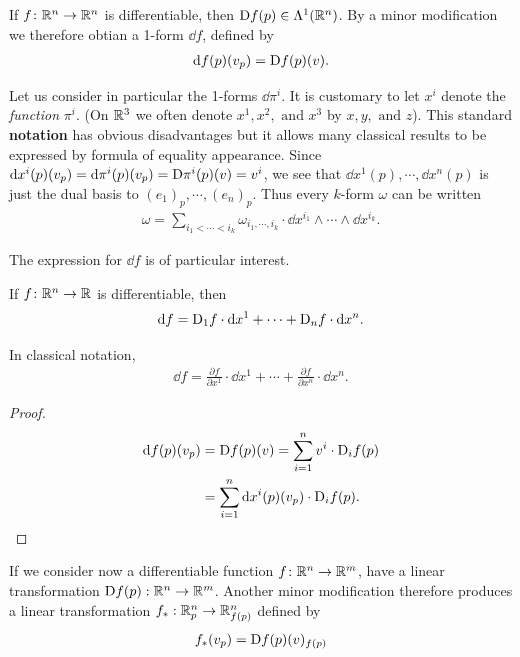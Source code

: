 If $f\colon{}\mathbb{R}^n\to \mathbb{R}^n$ is differentiable, then $\mathrm{D}f(p)\in\Lambda^1(\mathbb{R}^n)$. 
By a minor modification we therefore obtian a 1-form $\dd f$, defined by 
\begin{align*}
  \mathrm{d} f(p)(v_p) = \mathrm{D}f(p)(v).
\end{align*}

Let us consider in particular the 1-forms $\dd \pi^i$. It is customary to let $x^i$ denote the 
\textit{function} $\pi^i$. (On $\mathbb{R}^3$ we often denote $x^1,x^2,\text{ and }x^3$ by $x, y,\text{ and } z$).
This standard \textbf{notation} has obvious disadvantages but it allows many classical results to be expressed by 
formula of equality appearance. Since $\mathrm{d} x^i(p)(v_p) =\mathrm{d} \pi^i(p)(v_p) = \mathrm{D}\pi^i(p)(v) = v^i$, we 
see that $\dd x^1(p),\cdots,\dd x^n(p)$ is just the dual basis to $(e_1)_p,\cdots,(e_n)_p$. Thus
every $k$-form $\omega$ can be written
\begin{align*}
  \omega = \sum_{i_1<\cdots<i_k}^{}{\omega_{i_1,\cdots,i_k}\cdot \dd x^{i_1}\wedge\cdots\wedge\dd x^{i_k}}.
\end{align*}

The expression for $\dd f$ is of particular interest.

\begin{theorem}
    If $f\colon{}\mathbb{R}^n\to \mathbb{R}$ is differentiable, then 
    \begin{align*}
      \mathrm{d} f = \mathrm{D}_1 f\cdot \mathrm{d} x^1 + \cdots + \mathrm{D}_nf\cdot \mathrm{d} x^n.
    \end{align*} 

    In classical notation,
    \begin{align*}
      \dd f = \frac{\partial f}{\partial x^1}\cdot \dd x^1 + \cdots + \frac{\partial f}{\partial x^n}\cdot \dd x^n.
    \end{align*}
\end{theorem}

\begin{proof}
  \begin{align*}
    \mathrm{d} f(p)(v_p) 
        & = \mathrm{D}f(p)(v) 
        = \sum_{i=1}^{n}{v^i\cdot \mathrm{D}_i f(p)} \\
        & = \sum_{i=1}^{n}{\mathrm{d} x^i(p)(v_p)\cdot \mathrm{D}_i f(p)}.
  \end{align*}
\end{proof}


If we consider now a differentiable function $f\colon{}\mathbb{R}^n\to \mathbb{R}^m$, 
have a linear transformation $\mathrm{D}f(p):\mathbb{R}^n\to \mathbb{R}^m$. Another 
minor modification therefore produces a linear transformation $f_*:\mathbb{R}^n_p\to \mathbb{R}^n_{f(p)}$
defined by 
\begin{align*}
    f_*(v_p) = \mathrm{D}f(p)(v)_{f(p)}
\end{align*}

